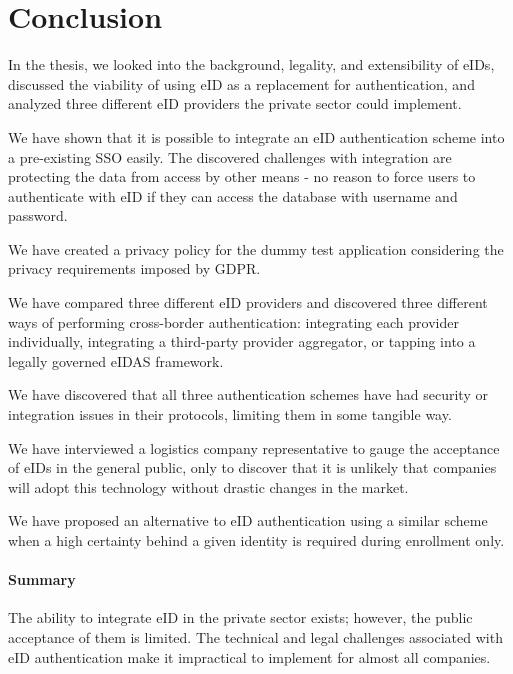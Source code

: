 \section{Conclusion}

In the thesis, we looked into the background, legality, and extensibility of eIDs, discussed the viability of using eID as a replacement for authentication, and analyzed three different eID providers the private sector could implement.

We have shown that it is possible to integrate an eID authentication scheme into a pre-existing SSO easily. The discovered challenges with integration are protecting the data from access by other means - no reason to force users to authenticate with eID if they can access the database with {username and password}.

We have created a privacy policy for the dummy test application considering the privacy requirements imposed by GDPR.

We have compared three different eID providers and discovered three different ways of performing cross-border authentication: integrating each provider individually, integrating a third-party provider aggregator, or tapping into a legally governed eIDAS framework.

We have discovered that all three authentication schemes have had security or integration issues in their protocols, limiting them in some tangible way.

We have interviewed a logistics company representative to gauge the acceptance of eIDs in the general public, only to discover that it is unlikely that companies will adopt this technology without drastic changes in the market.

We have proposed an alternative to eID authentication using a similar scheme when a high certainty behind a given identity is required during enrollment only.

\paragraph{Summary} The ability to integrate eID in the private sector exists; however, the public acceptance of them is limited. The technical and legal challenges associated with eID authentication make it impractical to implement for almost all companies.